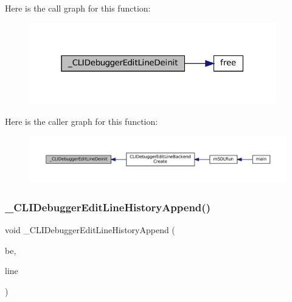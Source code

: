 Here is the call graph for this function\+:
\nopagebreak
\begin{figure}[H]
\begin{center}
\leavevmode
\includegraphics[width=304pt]{cli-el-backend_8c_a4ec593c2e2450412eed1176366439efe_cgraph}
\end{center}
\end{figure}
Here is the caller graph for this function\+:
\nopagebreak
\begin{figure}[H]
\begin{center}
\leavevmode
\includegraphics[width=350pt]{cli-el-backend_8c_a4ec593c2e2450412eed1176366439efe_icgraph}
\end{center}
\end{figure}
\mbox{\label{cli-el-backend_8c_a5676d6c82d7fd2e118185b8abe763611}} 
\subsubsection{\texorpdfstring{\+\_\+\+C\+L\+I\+Debugger\+Edit\+Line\+History\+Append()}{\_CLIDebuggerEditLineHistoryAppend()}}
{\footnotesize\ttfamily void \+\_\+\+C\+L\+I\+Debugger\+Edit\+Line\+History\+Append (\begin{DoxyParamCaption}\item[{struct C\+L\+I\+Debugger\+Backend $\ast$}]{be,  }\item[{const char $\ast$}]{line }\end{DoxyParamCaption})}

